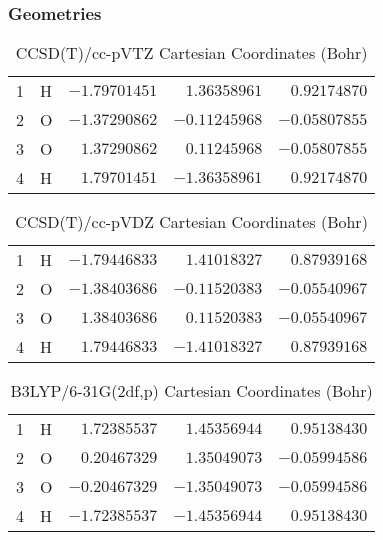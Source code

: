 \documentclass[10pt,oneside]{article}
\begin{document}
\clearpage

\subsection{\ \ \ }

\subsubsection*{Geometries}
\begin{table}[h!]
\centering
\caption{CCSD(T)/cc-pVTZ Cartesian Coordinates (Bohr)}
\begin{tabular}{llrrr}
1  & H  & $-1.79701451$ & $ 1.36358961$ & $ 0.92174870$ \\
2  & O  & $-1.37290862$ & $-0.11245968$ & $-0.05807855$ \\
3  & O  & $ 1.37290862$ & $ 0.11245968$ & $-0.05807855$ \\
4  & H  & $ 1.79701451$ & $-1.36358961$ & $ 0.92174870$ \\
\end{tabular}
\end{table}

\begin{table}[h!]
\centering
\caption{CCSD(T)/cc-pVDZ Cartesian Coordinates (Bohr)}
\begin{tabular}{llrrr}
1  & H  & $-1.79446833$ & $ 1.41018327$ & $ 0.87939168$ \\
2  & O  & $-1.38403686$ & $-0.11520383$ & $-0.05540967$ \\
3  & O  & $ 1.38403686$ & $ 0.11520383$ & $-0.05540967$ \\
4  & H  & $ 1.79446833$ & $-1.41018327$ & $ 0.87939168$ \\
\end{tabular}
\end{table}

\begin{table}[h!]
\centering
\caption{B3LYP/6-31G(2df,p) Cartesian Coordinates (Bohr)}
\begin{tabular}{llrrr}
1  & H  & $ 1.72385537$ & $ 1.45356944$ & $ 0.95138430$ \\
2  & O  & $ 0.20467329$ & $ 1.35049073$ & $-0.05994586$ \\
3  & O  & $-0.20467329$ & $-1.35049073$ & $-0.05994586$ \\
4  & H  & $-1.72385537$ & $-1.45356944$ & $ 0.95138430$ \\
\end{tabular}
\end{table}
\end{document}

